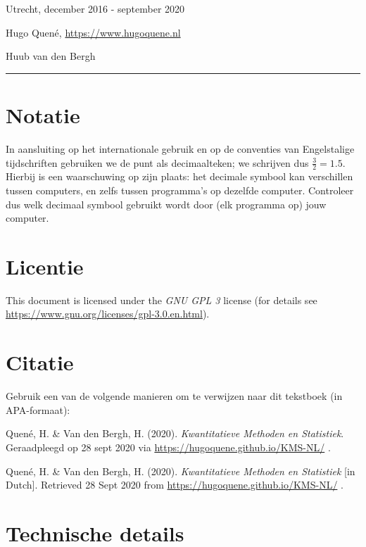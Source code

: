 \documentclass[
]{book}
\begin{document}
Utrecht, december 2016 - september 2020

Hugo Quené, \url{https://www.hugoquene.nl}

Huub van den Bergh

\begin{center}\rule{0.5\linewidth}{0.5pt}\end{center}

\hypertarget{notatie}{%
\section*{Notatie}\label{notatie}}

In aansluiting op het internationale gebruik en op de conventies van Engelstalige tijdschriften gebruiken we de punt als decimaalteken; we schrijven dus \(\frac{3}{2}=1.5\). Hierbij is een waarschuwing op zijn plaats: het decimale symbool kan verschillen tussen computers, en zelfs tussen programma's op dezelfde computer. Controleer dus welk decimaal symbool gebruikt wordt door (elk programma op) jouw computer.

\hypertarget{licentie}{%
\section*{Licentie}\label{licentie}}

This document is licensed under the \emph{GNU GPL 3} license (for details see
\url{https://www.gnu.org/licenses/gpl-3.0.en.html}).

\hypertarget{citatie}{%
\section*{Citatie}\label{citatie}}

Gebruik een van de volgende manieren om te verwijzen naar dit tekstboek (in APA-formaat):

Quené, H. \& Van den Bergh, H. (2020). \emph{Kwantitatieve Methoden en Statistiek}.
Geraadpleegd op 28 sept 2020 via \url{https://hugoquene.github.io/KMS-NL/} .

Quené, H. \& Van den Bergh, H. (2020). \emph{Kwantitatieve Methoden en Statistiek} {[}in Dutch{]}.
Retrieved 28 Sept 2020 from \url{https://hugoquene.github.io/KMS-NL/} .

\hypertarget{technische-details}{%
\section*{Technische details}\label{technische-details}}
\end{document}
